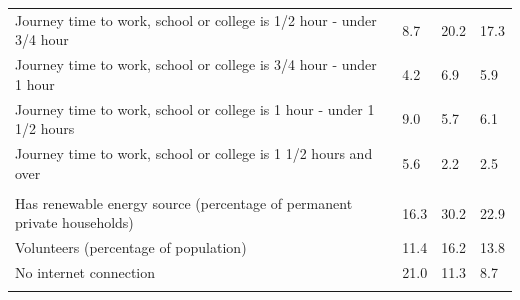 \documentclass{article}
\begin{document}
\begin{table}[h]
\begin{tabular}{KTTT}
Journey time to work, school or college is 1/2 hour - under 3/4 hour &  8.7& 20.2& 17.3\\
Journey time to work, school or college is 3/4 hour - under 1 hour & 4.2& 6.9& 5.9\\
Journey time to work, school or college is 1 hour - under 1 1/2 hours & 9.0& 5.7& 6.1\\
Journey time to work, school or college is 1 1/2 hours and over & 5.6& 2.2& 2.5\\
\hline
    \\ 
    \hline
Has renewable energy source (percentage of permanent private households) & 16.3& 30.2& 22.9\\
    \hline
Volunteers (percentage of population) & 11.4& 16.2& 13.8\\
    \hline
No internet connection& 21.0& 11.3&  8.7\\
\hline
\end{tabular}
\end{table}
\end{document}

